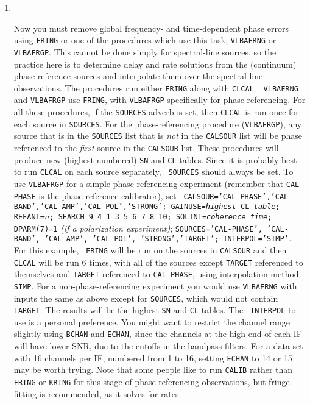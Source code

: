 \begin{enumerate}
\item\ {Now you must remove global frequency- and time-dependent phase
errors using {\tt FRING} or one of the
procedures which use this task, {\tt VLBAFRNG} or
{\tt VLBAFRGP}\@. This cannot be done simply for
spectral-line sources, so the practice here is to determine delay and
rate solutions from the (continuum) phase-reference sources and
interpolate them over the spectral line observations.  The procedures
run either {\tt FRING} along with {\tt CLCAL}\@.  {\tt
VLBAFRNG} and {\tt VLBAFRGP} use {\tt FRING}, with {\tt VLBAFRGP}
specifically for phase referencing.  For all these procedures, if the
{\tt SOURCES} adverb is set, then {\tt CLCAL} is run once for each source
in {\tt SOURCES}\@.  For the phase-referencing procedure ({\tt VLBAFRGP}),
any source that is in the {\tt SOURCES} list that is
{\it not\/} in the {\tt CALSOUR} list will be phase referenced to the
{\it first} source in the {\tt CALSOUR} list.  These procedures will
produce new (highest numbered) {\tt SN} and {\tt CL} tables.  Since it
is probably best to run {\tt CLCAL} on each source separately, {\tt
SOURCES} should always be set.  To use {\tt VLBAFRGP} for a simple
phase referencing experiment (remember that {\tt CAL-PHASE} is the
phase reference calibrator), set {\tt
CALSOUR='CAL-PHASE','CAL-BAND','CAL-AMP','CAL-POL','STRONG';
GAINUSE={\it highest} CL {\it table}; REFANT=$n$; SEARCH 9 4 1 3 5 6 7
8 10; SOLINT={\it coherence time}; DPARM(7)=1} {\it (if a polarization
experiment)}; {\tt SOURCES='CAL-PHASE', 'CAL-BAND', 'CAL-AMP',
'CAL-POL', 'STRONG','TARGET'; INTERPOL='SIMP'.}  For this example, {\tt
FRING} will be run on the sources in {\tt CALSOUR} and then {\tt
CLCAL} will be run 6 times, with all of the sources except {\tt TARGET}
referenced to themselves and {\tt TARGET} referenced to {\tt CAL-PHASE},
using interpolation method {\tt SIMP}\@.  For a non-phase-referencing
experiment you would use {\tt VLBAFRNG} with inputs the same as above
except for {\tt SOURCES}, which would not contain {\tt TARGET}\@.  The
results will be the highest {\tt SN} and {\tt CL} tables.  The {\tt
INTERPOL} to use is a personal preference.  You might want to
restrict the channel range slightly using {\tt BCHAN} and {\tt ECHAN},
since the channels at the high end of each IF will have lower SNR, due
to the cutoffs in the bandpass filters.  For a data set with 16
channels per IF, numbered from 1 to 16, setting {\tt ECHAN} to 14 or
15 may be worth trying.  Note that some people like to run {\tt CALIB}
rather than {\tt FRING} or {\tt KRING} for this stage of
phase-referencing observations, but fringe fitting is recommended, as
it solves for rates.

}
\end{enumerate}
